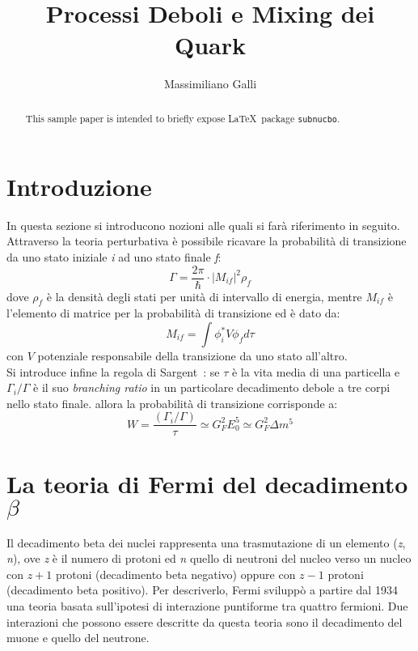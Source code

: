 \documentclass{subnucbo}
\title{Processi Deboli e Mixing dei Quark}
\author{Massimiliano Galli}
\begin{document}
\maketitle

\begin{abstract}
        This sample paper is intended to briefly expose \LaTeX\ package \texttt{subnucbo}.
\end{abstract}

\section{Introduzione}
In questa sezione si introducono nozioni alle quali si farà riferimento in seguito.\\
Attraverso la teoria perturbativa è possibile ricavare la probabilità di transizione da uno stato iniziale \textit{i} ad uno stato finale \textit{f}:
\begin{equation}
        \Gamma = \frac{2 \pi} {\hbar} \cdot | M_{if}|^{2} \rho_{f}
        \label{eq:decay_rate}
\end{equation}
dove $\rho_{f}$ è la densità degli stati per unità di intervallo di energia, mentre $M_{if}$ è l'elemento di matrice per la probabilità di transizione ed è dato da:
\begin{equation}
        M_{if} = \int \phi^{*}_{i} V \phi_{f} d\tau
        \label{eq:matrix_element}
\end{equation}
con $V$ potenziale responsabile della transizione da uno stato all'altro. \\
Si introduce infine la regola di Sargent~\cite{ref:BGS}: se $\tau$ è la vita media di una particella e $\Gamma_{i}/\Gamma$ è il suo \textit{branching ratio} in un particolare decadimento debole a tre corpi nello stato finale. allora la probabilità di transizione corrisponde a:
\begin{equation}
        W = \frac{(\Gamma_{i}/\Gamma)}{\tau} \simeq G_{F}^{2}E_{0}^{5} \simeq G_{F}^{2}\Delta m^{5}
        \label{eq:sargent_rule}
\end{equation}

\section{La teoria di Fermi del decadimento $\beta$}
Il decadimento beta dei nuclei rappresenta una trasmutazione di un elemento (\textit{z}, \textit{n}), ove \textit{z} è il numero di protoni ed \textit{n} quello di neutroni del nucleo verso un nucleo con $\textit{z} + 1$ protoni (decadimento beta negativo) oppure con $\textit{z} - 1$ protoni (decadimento beta positivo). Per descriverlo, Fermi sviluppò a partire dal 1934 una teoria basata sull'ipotesi di interazione puntiforme tra quattro fermioni. Due interazioni che possono essere descritte da questa teoria sono il decadimento del muone e quello del neutrone.
\end{document}

